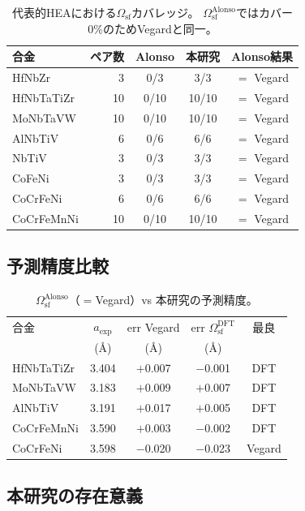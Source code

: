 \documentclass[5p,10pt]{elsarticle}
\begin{document}
\begin{table}[H]
\centering
\caption{代表的HEAにおける$\Omega_\text{sf}$カバレッジ。
  $\Omega_\text{sf}^\text{Alonso}$ではカバー0\%のためVegardと同一。}
\label{tab:alonso_coverage}
\footnotesize
\begin{tabular}{@{}lrccc@{}}
\toprule
合金 & ペア数 & Alonso & 本研究 & Alonso結果 \\
\midrule
HfNbZr & 3 & 0/3 & 3/3 & $=$ Vegard \\
HfNbTaTiZr & 10 & 0/10 & 10/10 & $=$ Vegard \\
MoNbTaVW & 10 & 0/10 & 10/10 & $=$ Vegard \\
AlNbTiV & 6 & 0/6 & 6/6 & $=$ Vegard \\
NbTiV & 3 & 0/3 & 3/3 & $=$ Vegard \\
CoFeNi & 3 & 0/3 & 3/3 & $=$ Vegard \\
CoCrFeNi & 6 & 0/6 & 6/6 & $=$ Vegard \\
CoCrFeMnNi & 10 & 0/10 & 10/10 & $=$ Vegard \\
\bottomrule
\end{tabular}
\end{table}

\subsection{予測精度比較}

\begin{table}[H]
\centering
\caption{$\Omega_\text{sf}^\text{Alonso}$（$=$Vegard）vs 本研究の予測精度。}
\label{tab:alonso_vs_ours}
\footnotesize
\begin{tabular}{@{}lcccc@{}}
\toprule
合金 & $a_\text{exp}$ & err Vegard & err $\Omega_\text{sf}^\text{DFT}$ & 最良 \\
 & (\AA) & (\AA) & (\AA) & \\
\midrule
HfNbTaTiZr & 3.404 & $+$0.007 & $-$0.001 & DFT \\
MoNbTaVW   & 3.183 & $+$0.009 & $+$0.007 & DFT \\
AlNbTiV    & 3.191 & $+$0.017 & $+$0.005 & DFT \\
CoCrFeMnNi & 3.590 & $+$0.003 & $-$0.002 & DFT \\
\midrule
CoCrFeNi   & 3.598 & $-$0.020 & $-$0.023 & Vegard \\
\bottomrule
\end{tabular}
\end{table}

\subsection{本研究の存在意義}
\end{document}

